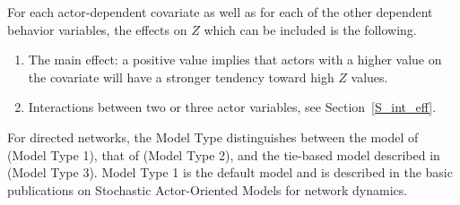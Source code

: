 \documentclass[a4paper,fleqn,11pt]{article}
\newcommand{\+}{\, + \,}
\newcommand{\SI}{{\sf SIENA }}
\newcommand{\si}{{\sf SIENA}}
\newcommand{\saom}{{Stochastic Actor-Oriented Model}}
\begin{document}
For each actor-dependent covariate as well as for each of the other
dependent behavior variables,
the effects on $Z$ which can be included is the following.
\begin{enumerate}
\item The main effect: a positive value implies that actors with a
      higher value on the covariate will have a stronger tendency
      toward high $Z$ values.

\item Interactions between two or three actor variables, see
      Section~\ref{S_int_eff}.
\end{enumerate}

\iffalse
For directed networks, the Model Type distinguishes between
the model of \citet{Snijders01} (Model Type 1),
that of \citet{Snijders03} (Model Type 2),
and the tie-based model described in \citet{Snijders06} (Model Type 3).
Model Type 1 is the default model and is
described in the basic publications on {\saom}s for network dynamics.
\end{document}
